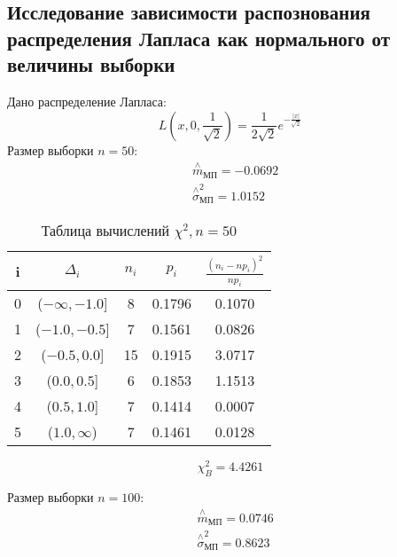 \documentclass[a4]{article}
\begin{document}
\subsection{Исследование зависимости распознования распределения Лапласа как нормального от величины выборки}
Дано распределение Лапласа:
\begin{equation}\label{eqn:laplace}
L\left( x,0,\frac{1}{\sqrt{2}}\right) = \frac{1}{2\sqrt{2}}e^{-\frac{\vert x\vert}{\sqrt{2}}}
\end{equation}
Размер выборки $n = 50$:
  \begin{equation}
  \begin{split}
  &\overset{\wedge}{m}_{\text{МП}} =-0.0692\\
  &  \overset{\wedge}{\sigma}^2_{\text{МП}} = 1.0152
  \end{split}
  \end{equation}

\begin{table}[H]
	\caption{Таблица вычислений $\chi^2, n = 50$}
	\label{tab:my_label1}
	\begin{center}
		\vspace{5mm}
		\begin{tabular}{|c|c|c|c|c|}
			\hline
			i & $\Delta_i$ & $n_i$ & $p_i$ & $\frac{(n_i-np_i)^2}{np_i}$\\ \hline
			0&  ($-\infty ,-1.0$]&  8&  0.1796&  0.1070\\ \hline
			1&  ($-1.0,-0.5$]&  7&  0.1561&  0.0826\\ \hline
			2&  ($-0.5,0.0$]&  15&  0.1915&  3.0717\\ \hline
			3&  ($0.0,0.5$]&  6&  0.1853&  1.1513\\ \hline
			4&  ($0.5,1.0$]&  7&  0.1414&  0.0007\\ \hline
			5&  ($ 1.0,\infty$)&  7&  0.1461&  0.0128\\ \hline
		\end{tabular}
	\end{center}
\end{table}

$$\chi_B^2 = 4.4261$$ 

Размер выборки $n = 100$:
  \begin{equation}
  \begin{split}
  &\overset{\wedge}{m}_{\text{МП}} =0.0746\\
  &  \overset{\wedge}{\sigma}^2_{\text{МП}} = 0.8623
  \end{split}
  \end{equation}
\end{document}
